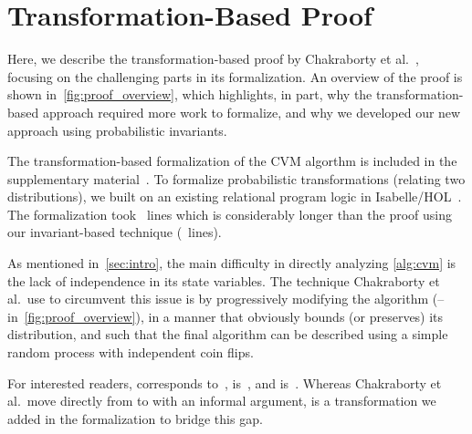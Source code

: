 \section{Transformation-Based Proof}\label{sec:transformation_based_proof}
Here, we describe the transformation-based proof by Chakraborty et al.~\cite{chakraborty2023}, focusing on the challenging parts in its formalization.
An overview of the proof is shown in~\cref{fig:proof_overview}, which highlights, in part, why the transformation-based approach required more work to formalize, and why we developed our new approach using probabilistic invariants.
\begin{note}
The transformation-based formalization of the CVM algorthm is included in the supplementary material~\cite{CVM_Transforms-Github}.
To formalize probabilistic transformations (relating two distributions), we built on an existing relational program logic in Isabelle/HOL~\cite{lochbihler2016}.
The formalization took \locold~lines which is considerably longer than the proof using our invariant-based technique (\locnew~lines).
\lipicsEnd\end{note}

As mentioned in~\cref{sec:intro}, the main difficulty in directly analyzing \cref{alg:cvm} is the lack of independence in its state variables.
The technique Chakraborty et al.\ use to circumvent this issue is by progressively modifying the algorithm (-- in~\cref{fig:proof_overview}), in a manner that obviously bounds (or preserves) its distribution, and such that the final algorithm  can be described using a simple random process with independent coin flips.

For interested readers,  corresponds to~\cite[Algorithm 1]{chakraborty2023},  is~\cite[Algorithm 2]{chakraborty2023}, and  is~\cite[Algorithm 3]{chakraborty2023}.
Whereas Chakraborty et al.\ move directly from  to  with an informal argument,  is a transformation we added in the formalization to bridge this gap.

